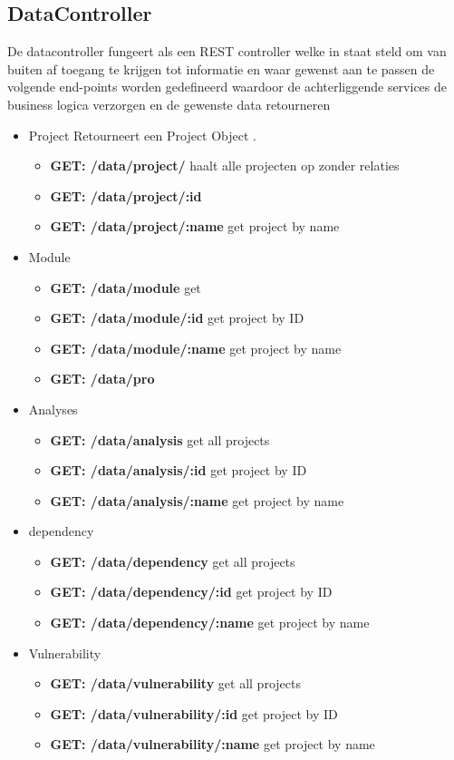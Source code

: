 \subsection{DataController}\label{subsec:datacontroller}
De datacontroller fungeert als een REST controller welke in staat steld om van buiten af toegang te krijgen tot informatie en waar gewenst aan te passen de volgende end-points worden gedefineerd waardoor de achterliggende services de business logica verzorgen en de gewenste data retourneren

\begin{itemize}
    \item Project Retourneert een Project Object .
        \begin{itemize}
            \item \textbf{GET: /data/project/} haalt alle projecten op zonder relaties
            \item \textbf{GET: /data/project/:id}
            \item \textbf{GET: /data/project/:name} get project by name
        \end{itemize}
    \item Module
    \begin{itemize}
        \item \textbf{GET: /data/module} get
        \item \textbf{GET: /data/module/:id} get project by ID
        \item \textbf{GET: /data/module/:name} get project by name
        \item \textbf{GET: /data/pro}
    \end{itemize}
    \item Analyses
    \begin{itemize}
        \item \textbf{GET: /data/analysis} get all projects
        \item \textbf{GET: /data/analysis/:id} get project by ID
        \item \textbf{GET: /data/analysis/:name} get project by name
    \end{itemize}
    \item dependency
    \begin{itemize}
        \item \textbf{GET: /data/dependency} get all projects
        \item \textbf{GET: /data/dependency/:id} get project by ID
        \item \textbf{GET: /data/dependency/:name} get project by name
    \end{itemize}
    \item Vulnerability
    \begin{itemize}
        \item \textbf{GET: /data/vulnerability} get all projects
        \item \textbf{GET: /data/vulnerability/:id} get project by ID
        \item \textbf{GET: /data/vulnerability/:name} get project by name
    \end{itemize}
\end{itemize}

